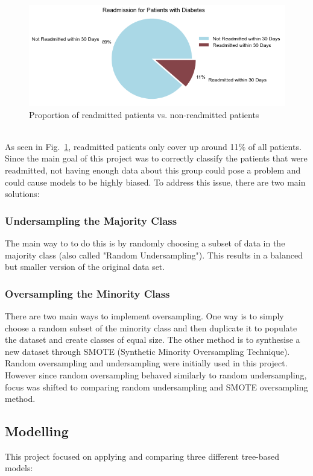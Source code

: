 \documentclass[letterpaper, 10 pt, conference]{ieeeconf}  %
\begin{document}
\begin{figure}[!hbt]
\centering
\includegraphics[width=1\columnwidth]{imbalanced.png}
\caption{Proportion of readmitted patients vs. non-readmitted patients}
\label{imb}
\end{figure}\\

As seen in Fig.~\ref{imb}, readmitted patients only cover up around 11$\%$ of all patients. Since the main goal of this project was to correctly classify the patients that were readmitted, not having enough data about this group could pose a problem and could cause models to be highly biased. To address this issue, there are two main solutions:

\subsubsection{Undersampling the Majority Class} The main way to to do this is by randomly choosing a subset of data in the majority class (also called "Random Undersampling"). This results in a balanced but smaller version of the original data set.

\subsubsection{Oversampling the Minority Class}
There are two main ways to implement oversampling. One way is to simply choose a random subset of the minority class and then duplicate it to populate the dataset and create classes of equal size. The other method is to synthesise a new dataset through SMOTE (Synthetic Minority Oversampling Technique). Random oversampling and undersampling were initially used in this project. However since random oversampling behaved similarly to random undersampling, focus was shifted to comparing random undersampling and SMOTE oversampling method.

\subsection{Modelling}
This project focused on applying and comparing three different tree-based models:
\end{document}
